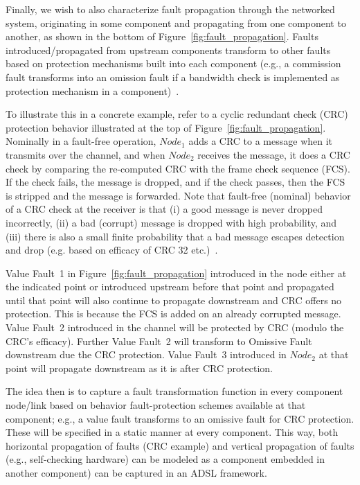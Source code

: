 Finally, we wish to also characterize fault
propagation through the networked system, originating in some component and
propagating from one component to another, as shown in the bottom of
Figure~\ref{fig:fault_propagation}. Faults introduced/propagated from upstream
components transform to other faults based on protection mechanisms built
into
each component (e.g., a commission fault transforms into an omission fault
if a
bandwidth check is implemented as protection mechanism in a component)~\cite{theory}.

To illustrate this in a concrete example, refer to a cyclic redundant check
(CRC) protection behavior illustrated at the top of
Figure~\ref{fig:fault_propagation}. Nominally in a fault-free operation,
$Node_1$ adds a CRC to a message when it transmits over the channel, and
when
$Node_2$ receives the message, it does a CRC check by comparing the re-computed
CRC
with the frame check sequence (FCS). If the check fails, the message is dropped,
and if the check
passes, then the FCS is stripped and the message is forwarded. Note that
fault-free
(nominal) behavior of a CRC check at the receiver is that (i) a good message
is
never dropped incorrectly, (ii) a bad (corrupt) message is dropped with high
probability, and (iii) there is also a small finite probability that a bad
message escapes detection and drop (e.g. based on efficacy of CRC 32 etc.)~\cite{crc}.

Value Fault~1 in Figure~\ref{fig:fault_propagation} introduced in the node
either at the indicated point or introduced upstream before that point and
propagated until that point will also continue to propagate downstream and
CRC
offers no protection. This is because the FCS is added on an already corrupted
message. Value Fault~2 introduced in the channel will be protected by CRC
(modulo the CRC's efficacy). Further Value Fault~2 will transform to Omissive Fault downstream due the CRC protection. 
Value Fault~3 introduced in $Node_2$ at that
point will propagate downstream as it is after CRC protection.

The idea then is to capture a fault transformation function in every
component
node/link based on behavior fault-protection schemes available at that component;
e.g., a value fault transforms to an omissive fault for CRC protection. 
These will be
specified in a static manner at every component. This way, both horizontal
propagation of faults (CRC example) and vertical propagation of faults
(e.g., self-checking hardware) can be modeled as a component embedded
in another
component) can be captured in an ADSL framework.


